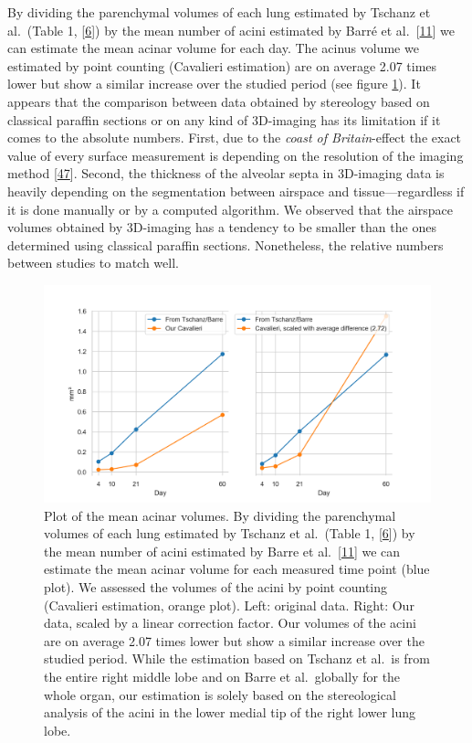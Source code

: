 \documentclass[
  american,
]{article}
\begin{document}
By dividing the parenchymal volumes of each lung estimated by Tschanz et al.~(Table 1, {[}\protect\hyperlink{ref-wnl86DEM}{6}{]}) by the mean number of acini estimated by Barré et al.~{[}\protect\hyperlink{ref-uFNlWogb}{11}{]} we can estimate the mean acinar volume for each day.
The acinus volume we estimated by point counting (Cavalieri estimation) are on average 2.07 times lower but show a similar increase over the studied period (see figure \ref{fig:06}).
It appears that the comparison between data obtained by stereology based on classical paraffin sections or on any kind of 3D-imaging has its limitation if it comes to the absolute numbers.
First, due to the \emph{coast of Britain}-effect the exact value of every surface measurement is depending on the resolution of the imaging method {[}\protect\hyperlink{ref-AdXhaEV4}{47}{]}.
Second, the thickness of the alveolar septa in 3D-imaging data is heavily depending on the segmentation between airspace and tissue---regardless if it is done manually or by a computed algorithm.
We observed that the airspace volumes obtained by 3D-imaging has a tendency to be smaller than the ones determined using classical paraffin sections.
Nonetheless, the relative numbers between studies to match well.

\begin{figure}
\hypertarget{fig:06}{%
\centering
\includegraphics{images/fig06.png}
\caption{Plot of the mean acinar volumes.
By dividing the parenchymal volumes of each lung estimated by Tschanz et al.~(Table 1, {[}\protect\hyperlink{ref-wnl86DEM}{6}{]}) by the mean number of acini estimated by Barre et al.~{[}\protect\hyperlink{ref-uFNlWogb}{11}{]} we can estimate the mean acinar volume for each measured time point (blue plot).
We assessed the volumes of the acini by point counting (Cavalieri estimation, orange plot).
Left: original data.
Right: Our data, scaled by a linear correction factor.
Our volumes of the acini are on average 2.07 times lower but show a similar increase over the studied period.
While the estimation based on Tschanz et al.~is from the entire right middle lobe and on Barre et al.~globally for the whole organ, our estimation is solely based on the stereological analysis of the acini in the lower medial tip of the right lower lung lobe.}\label{fig:06}
}
\end{figure}
\end{document}
